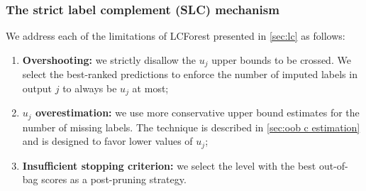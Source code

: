 \documentclass[conference,compsoc]{IEEEtran}
\newcommand{\el}[1]{_{#1}}
\begin{document}
\subsubsection{The strict label complement (SLC) mechanism}
\label{sec:slc}


We address each of the limitations of LCForest presented in \autoref{sec:lc} as follows:
%
\begin{enumerate}
    \item \textbf{Overshooting:} we strictly disallow the $u_j$ upper bounds to be crossed. We select the best-ranked predictions to enforce the number of imputed labels in output $j$ to always be $u\el{j}$ at most;
    \item \textbf{$u_j$ overestimation:} we use more conservative upper bound estimates for the number of missing labels. The technique is described in \autoref{sec:oob c estimation} and is designed to favor lower values of $u_j$;
    \item \textbf{Insufficient stopping criterion:} we select the level with the best out-of-bag scores as a post-pruning strategy.%
\end{enumerate}


\end{document}
